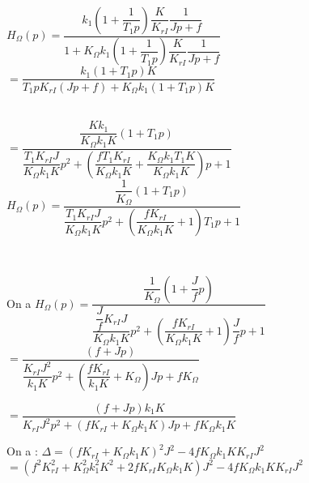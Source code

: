 \begin{multicols}{2}
 
 
 
 \fi
 


\ifprof
\begin{corrige}~\\

$H_{\Omega}(p)=\dfrac{k_{1}\left( 1 + \dfrac{1}{T_{1}p} \right)\dfrac{K}{K_{rI}}\dfrac{1}{Jp+f}}{1+ K_{\Omega}k_{1}\left( 1 +\dfrac{1}{T_{1}p} \right)\dfrac{K}{K_{rI}}\dfrac{1}{Jp+f}}$
$=\dfrac{k_{1}\left( 1 + T_{1}p \right)K}{T_{1}p K_{rI}\left(Jp+f\right) + K_{\Omega}k_{1}\left(1+ T_{1}p\right) K}$

~\\

$=\dfrac{\dfrac{Kk_{1}}{K_{\Omega}k_{1}K}\left( 1 + T_{1}p \right)}{\dfrac{T_{1} K_{rI}J}{K_{\Omega}k_{1}K}p^2+\left(\dfrac{fT_{1} K_{rI}}{K_{\Omega}k_{1}K}+\dfrac{K_{\Omega}k_{1}T_{1}K}{K_{\Omega}k_{1}K}\right)p + 1 }$
$H_{\Omega}(p)=\dfrac{\dfrac{1}{K_{\Omega}}\left( 1 + T_{1}p \right)}{\dfrac{T_{1} K_{rI}J}{K_{\Omega}k_{1}K}p^2+\left(\dfrac{f K_{rI}}{K_{\Omega}k_{1}K}+1\right)T_{1}p + 1 }$

\end{corrige}
\else
\fi


\ifprof
\begin{corrige}~\\

\footnotesize

On a 
$H_{\Omega}(p)=\dfrac{\dfrac{1}{K_{\Omega}}\left( 1 + \dfrac{J}{f}p \right)}{\dfrac{\dfrac{J}{f} K_{rI}J}{K_{\Omega}k_{1}K}p^2+\left(\dfrac{f K_{rI}}{K_{\Omega}k_{1}K}+1\right)\dfrac{J}{f}p + 1 }$
$=\dfrac{\left( f + Jp \right)}{\dfrac{ K_{rI}J^2}{k_{1}K}p^2+\left(\dfrac{f K_{rI}}{k_{1}K}+K_{\Omega}\right)Jp + fK_{\Omega}}$

$=\dfrac{\left( f + Jp \right)k_{1}K}{ K_{rI}J^2p^2+\left(f K_{rI}+K_{\Omega}k_{1}K\right)Jp + fK_{\Omega}k_{1}K}$


On a :
$\Delta =\left(f K_{rI}+K_{\Omega}k_{1}K\right)^2J^2 -4 fK_{\Omega}k_{1}KK_{rI}J^2 $ 
$=\left(f^2 K_{rI}^2+K_{\Omega}^2k_{1}^2K^2+2f K_{rI}K_{\Omega}k_{1}K\right)J^2 -4 fK_{\Omega}k_{1}KK_{rI}J^2 $


\end{corrige}
\end{multicols}
